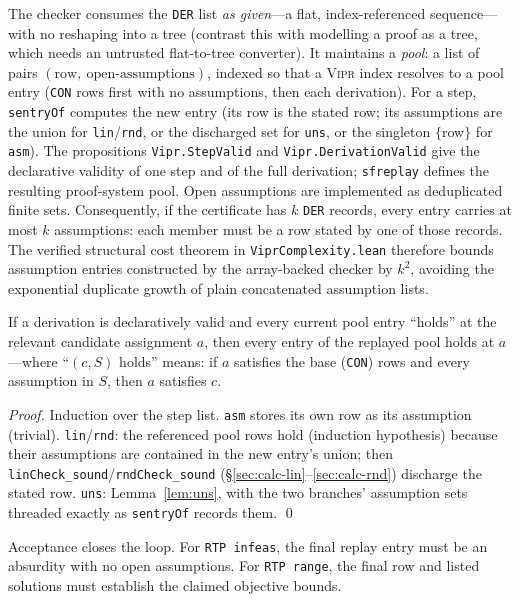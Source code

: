 \documentclass[runningheads]{llncs}
\newcommand{\code}[1]{\texttt{#1}}
\newcommand{\vipr}{\textsc{Vipr}}
\begin{document}
The checker consumes the \code{DER} list \emph{as given}---a flat, index-referenced
sequence---with no reshaping into a tree (contrast this with modelling a proof as a tree,
which needs an untrusted flat-to-tree converter). It maintains a \emph{pool}: a list of
pairs $(\text{row},\ \text{open-assumptions})$, indexed so that a \vipr{} index resolves
to a pool entry (\code{CON} rows first with no assumptions, then each derivation). For a
step, \code{sentryOf} computes the new entry (its row is the stated row; its assumptions
are the union for \code{lin}/\code{rnd}, or the discharged set for \code{uns}, or the
singleton $\{$row$\}$ for \code{asm}). The propositions \code{Vipr.StepValid} and
\code{Vipr.DerivationValid} give the declarative validity of one step and of the full
derivation; \code{sfreplay} defines the resulting proof-system pool.
Open assumptions are implemented as deduplicated finite sets.  Consequently, if
the certificate has $k$ \code{DER} records, every entry carries at most $k$ assumptions:
each member must be a row stated by one of those records.  The verified structural
cost theorem in \code{ViprComplexity.lean} therefore bounds assumption entries
constructed by the array-backed checker by $k^2$, avoiding
the exponential duplicate growth of plain concatenated assumption lists.

\begin{theorem}[replay invariant, \code{Vipr.replay\_sound}]\label{thm:replay}
If a derivation is declaratively valid and every current pool entry ``holds'' at the
relevant candidate assignment $a$, then every entry of the replayed pool holds at
$a$---where
``$(c,S)$ holds'' means: if $a$ satisfies the base (\code{CON}) rows and every assumption
in $S$, then $a$ satisfies $c$.
\end{theorem}
\begin{proof}
Induction over the step list. \code{asm} stores its own row as its assumption
(trivial). \code{lin}/\code{rnd}: the referenced pool rows hold (induction hypothesis)
because their assumptions are contained in the new entry's union; then
\code{linCheck\_sound}/\code{rndCheck\_sound} (\S\ref{sec:calc-lin}--\ref{sec:calc-rnd})
discharge the stated row. \code{uns}: Lemma~\ref{lem:uns}, with the two branches'
assumption sets threaded exactly as \code{sentryOf} records them. \qed
\end{proof}

Acceptance closes the loop. For \code{RTP infeas}, the final replay entry must be an
absurdity with no open assumptions. For \code{RTP range}, the final row and listed
solutions must establish the claimed objective bounds.
\end{document}
